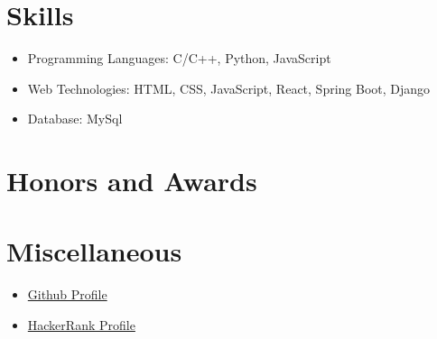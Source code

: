 \documentclass{resume}
\begin{document}

\section{Skills}
\begin{itemize}[parsep=0.5ex]
  \item Programming Languages: C/C++, Python, JavaScript
  \item Web Technologies: HTML, CSS, JavaScript, React, Spring Boot, Django
  \item Database: MySql
\end{itemize}

\section{Honors and Awards}

\section{Miscellaneous}
\begin{itemize}[parsep=0.5ex]
  \item \href{https://github.com/AdityaKomawar}{Github Profile} 
  \item \href{https://www.hackerrank.com/adityakomawar7}{HackerRank Profile} 
\end{itemize}

%
%
\end{document}
